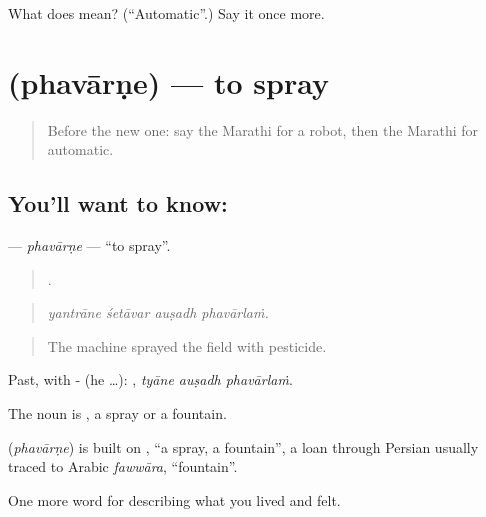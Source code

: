 \begin{tcolorbox}[breakable,colback=teal!4,colframe=teal!35!black,title={Before you move on}]
What does  mean? (\textquotedblleft{}Automatic\textquotedblright{}.) Say it once more.
\end{tcolorbox}
\section[\texorpdfstring{\mr{फवारणे} (phavārṇe)}{फवारणे (phavārṇe)}]{ (phavārṇe) — to spray}

\label{lesson:MR-C518-phavarne}



\begin{quote}
Before the new one: say the Marathi for a robot, then the Marathi for automatic.
\end{quote}

\subsection*{You'll want to know: }
\textbf{} — \emph{phavārṇe} — \textquotedblleft{}to spray\textquotedblright{}.

\begin{quote}
   .
\end{quote}

\begin{quote}
\emph{yantrāne śetāvar auṣadh phavārlaṁ.}
\end{quote}

\begin{quote}
The machine sprayed the field with pesticide.
\end{quote}

Past, with - (he …):   , \emph{tyāne auṣadh phavārlaṁ}.

The noun is , a spray or a fountain.

\begin{cousinweb}
\textbf{} (\emph{phavārṇe}) is built on , \textquotedblleft{}a spray, a fountain\textquotedblright{}, a loan through Persian usually traced to Arabic \emph{fawwāra}, \textquotedblleft{}fountain\textquotedblright{}.
\end{cousinweb}

\begin{grammarlens}[title={What you've built}]
One more word for describing what you lived and felt.
\end{grammarlens}


